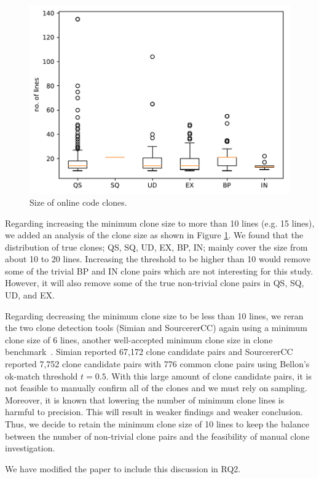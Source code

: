 \documentclass[a4paper,twoside,10pt]{reviewresponse}
\begin{document}
\begin{figure}[H]
	\centering
	\includegraphics[width=0.5\linewidth]{../boxplot_clone_size}
	\caption{Size of online code clones.}
	\label{fig:boxplotclonesize}
\end{figure}

Regarding increasing the minimum clone size to more than 10 lines (e.g. 15 lines), we added an analysis of the clone size as shown in Figure \ref{fig:boxplotclonesize}. We found that the distribution of true clones; QS, SQ, UD, EX, BP, IN; mainly cover the size from about 10 to 20 lines. Increasing the threshold to be higher than 10 would remove some of the trivial BP and IN clone pairs which are not interesting for this study. However, it will also remove some of the true non-trivial clone pairs in QS, SQ, UD, and EX.

Regarding decreasing the minimum clone size to be less than 10 lines, we reran the two clone detection tools (Simian and SourcererCC) again using a minimum clone size of 6 lines, another well-accepted minimum clone size in clone benchmark~\citep{Bellon2007}. Simian reported 67,172 clone candidate pairs and SourcererCC reported 7,752 clone candidate pairs with 776 common clone pairs using Bellon's ok-match threshold $t=0.5$. With this large amount of clone candidate pairs, it is not feasible to manually confirm all of the clones and we must rely on sampling. Moreover, it is known that lowering the number of minimum clone lines is harmful to precision. This will result in weaker findings and weaker conclusion. Thus, we decide to retain the minimum clone size of 10 lines to keep the balance between the number of non-trivial clone pairs and the feasibility of manual clone investigation.

We have modified the paper to include this discussion in RQ2.

\end{document}
